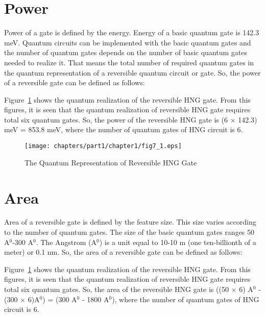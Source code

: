 \section{Power}
Power of a gate is defined by the energy. Energy of a basic quantum gate is 142.3 meV. Quantum circuits can be implemented with the basic quantum gates and the number of quantum gates depends on the number of basic quantum gates needed to realize it. That means  the total number of required quantum gates in the quantum representation of a reversible quantum circuit or gate. So, the power of a reversible gate can be defined as follows: 


\begin{example}\textnormal{
	Figure~\ref{fig:p1_c1_fig7_1} shows the quantum realization of the reversible HNG gate. From this figures, it is seen that the quantum realization of reversible HNG gate requires total six quantum gates. So, the power of the reversible HNG gate is (6 $\times$ 142.3) meV = 853.8 meV, where the number of quantum gates of HNG circuit is 6.}
\end{example}


\begin{figure}[H]
	\centering
	\texttt{[image: chapters/part1/chapter1/fig7\_1.eps]}
	\caption{The Quantum Representation of Reversible HNG Gate}
	\label{fig:p1_c1_fig7_1}
\end{figure}

\section{Area}
Area of a  reversible gate is defined by the feature size. This size varies according to the number of quantum gates. The size of the basic quantum gates ranges 50 A$^0$-300 A$^0$. The Angstrom (A$^0$) is a unit equal to 10-10 m (one ten-billionth of a meter) or 0.1 nm. So, the area of a reversible gate can be defined as follows: 


\begin{example}\textnormal{
	Figure~\ref{fig:p1_c1_fig7_1} shows the quantum realization of the reversible HNG gate. From this figures, it is seen that the quantum realization of reversible HNG gate requires total six quantum gates. So, the area of the reversible HNG gate is ((50 $\times$ 6) A$^0$ - (300 $\times$ 6)A$^0$) = (300 A$^0$ - 1800 A$^0$), where the number of quantum gates of HNG circuit is 6.}
\end{example} 


